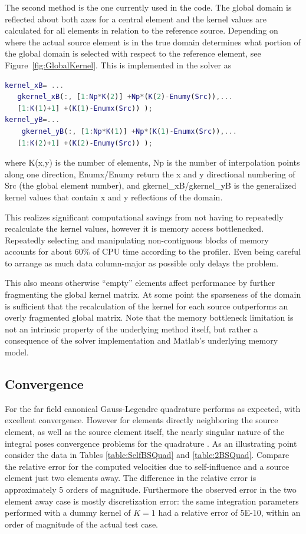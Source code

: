 \documentclass[letterpaper,12pt]{report}
\begin{document}
The second method is the one currently used in the code. The global domain is reflected about both axes for a central element and the kernel values are calculated for all elements in relation to the reference source. Depending on where the actual source element is in the true domain determines what portion of the global domain is selected with respect to the reference element, see Figure~\ref{fig:GlobalKernel}. This is implemented in the solver as

\singlespacing
\begin{lstlisting}[language=Matlab]
kernel_xB= ...
   gkernel_xB(:, [1:Np*K(2)] +Np*(K(2)-Enumy(Src)),...
   [1:K(1)+1] +(K(1)-Enumx(Src)) );
kernel_yB=...
    gkernel_yB(:, [1:Np*K(1)] +Np*(K(1)-Enumx(Src)),...
   [1:K(2)+1] +(K(2)-Enumy(Src)) );
\end{lstlisting}
\doublespacing

where K(x,y) is the number of elements, Np is the number of interpolation points along one direction, Enumx/Enumy return the x and y directional numbering of Src (the global element number), and gkernel\_xB/gkernel\_yB is the generalized kernel values that contain x and y reflections of the domain.

This realizes significant computational savings from not having to repeatedly recalculate the kernel values, however it is memory access bottlenecked. Repeatedly selecting and manipulating non-contiguous blocks of memory accounts for about 60\% of CPU time according to the profiler. Even being careful to arrange as much data column-major as possible only delays the problem.

This also means otherwise ``empty'' elements affect performance by further fragmenting the global kernel matrix. At some point the sparseness of the domain is sufficient that the recalculation of the kernel for each source outperforms an overly fragmented global matrix. Note that the memory bottleneck limitation is not an intrinsic property of the underlying method itself, but rather a consequence of the solver implementation and Matlab's underlying memory model.

\subsection{Convergence}
For the far field canonical Gauss-Legendre quadrature performs as expected, with excellent convergence. However for elements directly neighboring the source element, as well as the source element itself, the nearly singular nature of the integral poses convergence problems for the quadrature \cite{Strain1996}. As an illustrating point consider the data in Tables \ref{table:SelfBSQuad} and \ref{table:2BSQuad}. Compare the relative error for the computed velocities due to self-influence and a source element just two elements away. The difference in the relative error is approximately 5 orders of magnitude. Furthermore the observed error in the two element away case is mostly discretization error: the same integration parameters performed with a dummy kernel of $K=1$ had a relative error of 5E-10, within an order of magnitude of the actual test case.
\end{document}
